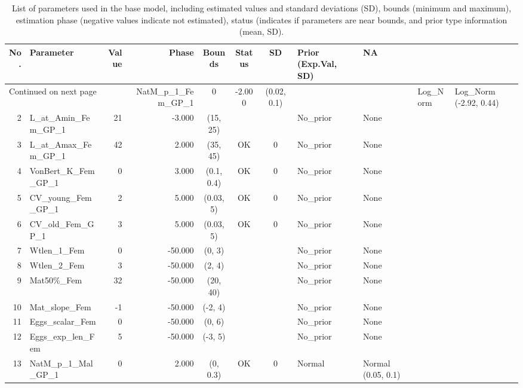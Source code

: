 \documentclass[12pt,]{article}
\begin{document}
\begin{landscape}
\begin{longtable}{rlrrcccll}
\caption{List of parameters used in
                                          the base model, including estimated 
                                          values and standard deviations (SD), 
                                          bounds (minimum and maximum), 
                                          estimation phase (negative values indicate
                                          not estimated), status (indicates if 
                                          parameters are near bounds, and prior type
                                          information (mean, SD).} \\ 
  \hline
No. & Parameter & Value & Phase & Bounds & Status & SD & Prior (Exp.Val, SD)  & NA \\ 
  \hline 
\endhead 
\hline 
\multicolumn{3}{l}{\footnotesize Continued on next page} 
\endfoot 
\endlastfoot 
 \hline
1 & NatM\_p\_1\_Fem\_GP\_1 & 0 & -2.000 & (0.02, 0.1) &  &  & Log\_Norm & Log\_Norm (-2.92, 0.44) \\ 
  2 & L\_at\_Amin\_Fem\_GP\_1 & 21 & -3.000 & (15, 25) &  &  & No\_prior & None \\ 
  3 & L\_at\_Amax\_Fem\_GP\_1 & 42 & 2.000 & (35, 45) & OK & 0 & No\_prior & None \\ 
  4 & VonBert\_K\_Fem\_GP\_1 & 0 & 3.000 & (0.1, 0.4) & OK & 0 & No\_prior & None \\ 
  5 & CV\_young\_Fem\_GP\_1 & 2 & 5.000 & (0.03, 5) & OK & 0 & No\_prior & None \\ 
  6 & CV\_old\_Fem\_GP\_1 & 3 & 5.000 & (0.03, 5) & OK & 0 & No\_prior & None \\ 
  7 & Wtlen\_1\_Fem & 0 & -50.000 & (0, 3) &  &  & No\_prior & None \\ 
  8 & Wtlen\_2\_Fem & 3 & -50.000 & (2, 4) &  &  & No\_prior & None \\ 
  9 & Mat50\%\_Fem & 32 & -50.000 & (20, 40) &  &  & No\_prior & None \\ 
  10 & Mat\_slope\_Fem & -1 & -50.000 & (-2, 4) &  &  & No\_prior & None \\ 
  11 & Eggs\_scalar\_Fem & 0 & -50.000 & (0, 6) &  &  & No\_prior & None \\ 
  12 & Eggs\_exp\_len\_Fem & 5 & -50.000 & (-3, 5) &  &  & No\_prior & None \\ 
  13 & NatM\_p\_1\_Mal\_GP\_1 & 0 & 2.000 & (0, 0.3) & OK & 0 & Normal & Normal (0.05, 0.1) \\ 

\end{longtable}
\end{landscape}
\end{document}
